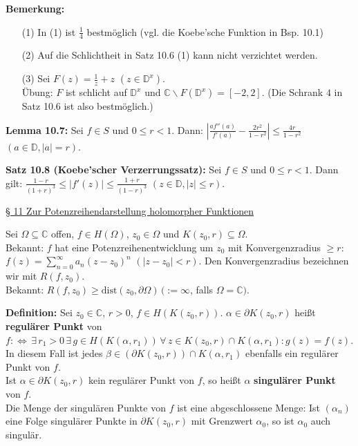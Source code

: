 \documentclass[11pt]{article}
\newcommand{\C}{\mathbb{C}}
\newcommand{\D}{\mathbb{D}}
\begin{document}
\textbf{Bemerkung:} 
\vspace{-0.6cm} 
\begin{itemize}
\item[(1)] In (1) ist $\frac{1}{4}$ bestmöglich (vgl. die Koebe'sche Funktion in Bsp. 10.1) \vspace{-0.2cm}
\item[(2)] Auf die Schlichtheit in Satz 10.6 (1) kann nicht verzichtet werden.  \vspace{-0.2cm}
\item[(3)] Sei $F(z) = \frac{1}{z} + z$ $(z \in \D^x)$. \\
Übung: $F$ ist schlicht auf $\D^x$ und $\C \backslash F(\D^x) = [-2,2]$. (Die Schrank $4$ in Satz 10.6 ist also bestmöglich.)
\end{itemize} 
\vspace{-0.3cm}

\textbf{Lemma 10.7:} Sei $f \in S$ und $0 \leq r < 1$. Dann: $|\frac{a f''(a)}{f'(a)} - \frac{2r^2}{1-r^2}| \leq \frac{4r}{1-r^2}$ $(a \in \D, |a| = r)$.

\textbf{Satz 10.8 (Koebe'scher Verzerrungssatz):} Sei $f \in S$ und $0 \leq r < 1$. Dann gilt: $\frac{1-r}{(1+r)^3} \leq |f'(z)| \leq \frac{1+r}{(1-r)^3}$ $(z \in \D, |z| \leq r)$.

\underline{§ 11 Zur Potenzreihendarstellung holomorpher Funktionen}

Sei $\Omega \subseteq \C$ offen, $f \in H(\Omega)$, $z_0 \in \Omega$ und $K(z_0,r) \subseteq \Omega$. \\
Bekannt: $f$ hat eine Potenzreihenentwicklung um $z_0$ mit Konvergenzradius $\geq r$: $f(z) = \sum_{n=0}^\infty a_n (z - z_0)^n$ $(|z-z_0| < r)$. Den Konvergenzradius bezeichnen wir mit $R(f,z_0)$. \\
Bekannt: $R(f,z_0) \geq \text{dist}(z_0, \partial \Omega) \, (:= \infty$, falls $\Omega = \C)$.

\textbf{Definition:} Sei $z_0 \in \C$, $r > 0$, $f \in H(K(z_0, r))$. $\alpha \in \partial K(z_0,r)$ heißt \textbf{regulärer Punkt} von $f :\Leftrightarrow \, \exists \, r_1 > 0 \, \exists \, g \in H(K(\alpha, r_1)) \, \forall \, z \in K(z_0,r) \cap K(\alpha, r_1) \colon g(z) = f(z)$. \\
In diesem Fall ist jedes $\beta \in (\partial K(z_0,r)) \cap K(\alpha, r_1)$ ebenfalls ein regulärer Punkt von $f$. \\
Ist $\alpha \in \partial K(z_0, r)$ kein regulärer Punkt von $f$, so heißt $\alpha$ \textbf{singulärer Punkt} von $f$. \\
Die Menge der singulären Punkte von $f$ ist eine abgeschlossene Menge: Ist $(\alpha_n)$ eine Folge singulärer Punkte in $\partial K(z_0,r)$ mit Grenzwert $\alpha_0$, so ist $\alpha_0$ auch singulär. 
\end{document}
